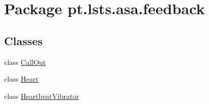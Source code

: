 \hypertarget{namespacept_1_1lsts_1_1asa_1_1feedback}{}\section{Package pt.\+lsts.\+asa.\+feedback}
\label{namespacept_1_1lsts_1_1asa_1_1feedback}
\subsection*{Classes}
\begin{DoxyCompactItemize}
\item 
class \hyperlink{classpt_1_1lsts_1_1asa_1_1feedback_1_1CallOut}{Call\+Out}
\item 
class \hyperlink{classpt_1_1lsts_1_1asa_1_1feedback_1_1Heart}{Heart}
\item 
class \hyperlink{classpt_1_1lsts_1_1asa_1_1feedback_1_1HeartbeatVibrator}{Heartbeat\+Vibrator}
\end{DoxyCompactItemize}
